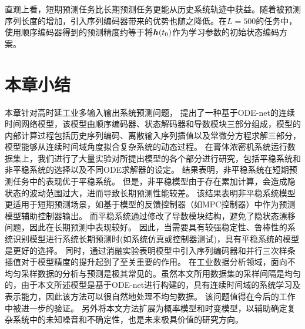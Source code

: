 直观上看，短期预测任务比长期预测任务更能从历史系统轨迹中获益。随着被预测序列长度的增加，引入序列编码器带来的优势也随之降低。在$L=500$的任务中，使用顺序编码器得到的预测精度约等于将$\boldsymbol h(t_0)$作为学习参数的初始状态编码方案。
\section{本章小结}
\label{sec:conc}
本章针对高时延工业多输入输出系统预测问题，
提出了一种基于ODE-net的连续时间网络模型，该模型由顺序编码器、状态解码器和导数模块三部分组成，模型的内部计算过程包括历史序列编码、离散输入序列插值以及常微分方程求解三部分，模型能够从连续时间域角度拟合复杂系统的动态过程。
在膏体浓密机系统运行数据集上，我们进行了大量实验对所提出模型的各个部分进行研究，包括平稳系统和非平稳系统的选择以及不同ODE求解器的设定。
结果表明，非平稳系统在短期预测任务中的表现优于平稳系统。
但是，非平稳模型由于存在累加计算，会造成隐状态的波动范围过大，进而导致长期预测性能较差。
该结果表明非平稳系统模型更适用于短期预测场景，如基于模型的反馈控制器（如MPC控制器）中作为预测模型辅助控制器输出。
而平稳系统通过修改了导数模块结构，避免了隐状态漂移问题，因此在长期预测中表现较好。
因此，当需要具有较强稳定性、鲁棒性的系统识别模型进行系统长期预测时(如系统仿真或控制器测试)，具有平稳系统的模型是更好的选择。
同时，通过消融实验表明模型中引入序列编码器和并行三次样条插值对于模型精度的提升起到了至关重要的作用。
在工业数据分析领域，面向不均匀采样数据的分析与预测是极其常见的。虽然本文所用数据集的采样间隔是均匀的，由于本文所述模型是基于ODE-net进行构建的，具有连续时间域的系统学习及表示能力，因此该方法可以很自然地处理不均匀数据。
该问题值得在今后的工作中被进一步的验证。
另外将本文方法扩展为概率模型和时变模型，以辅助确定复杂系统中的未知噪音和不确定性，也是未来极具价值的研究方向。
